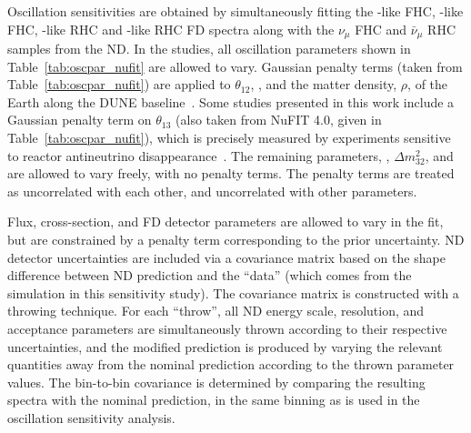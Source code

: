 Oscillation sensitivities are obtained by simultaneously fitting the \numu-like FHC, \nue-like FHC, \anumu-like RHC and \anue-like RHC FD spectra along with the $\nu_{\mu}$ FHC and $\bar{\nu}_{\mu}$ RHC samples from the ND. In the studies, all oscillation parameters shown in Table~\ref{tab:oscpar_nufit} are allowed to vary. Gaussian penalty terms (taken from Table~\ref{tab:oscpar_nufit}) are applied to $\theta_{12}$, , and the matter density, $\rho$, of the Earth along the DUNE baseline~\cite{Roe:2017zdw}. Some studies presented in this work include a Gaussian penalty term on $\theta_{13}$ (also taken from NuFIT 4.0, given in Table~\ref{tab:oscpar_nufit}), which is precisely measured by experiments sensitive to reactor antineutrino disappearance~\cite{Abrahao:2020ztg,Adey:2018zwh,Bak:2018ydk}. The remaining parameters, , $\Delta m^{2}_{32}$, and \deltacp are allowed to vary freely, with no penalty terms. The penalty terms are treated as uncorrelated with each other, and uncorrelated with other parameters.

Flux, cross-section, and FD detector parameters are allowed to vary in the fit, but are constrained by a penalty term corresponding to the prior uncertainty. ND detector uncertainties are included via a covariance matrix based on the shape difference between ND prediction and the ``data'' (which comes from the simulation in this sensitivity study). The covariance matrix is constructed with a throwing technique. For each ``throw'', all ND energy scale, resolution, and acceptance parameters are simultaneously thrown according to their respective uncertainties, and the modified prediction is produced by varying the relevant quantities away from the nominal prediction according to the thrown parameter values. The bin-to-bin covariance is determined by comparing the resulting spectra with the nominal prediction, in the same binning as is used in the oscillation sensitivity analysis.

